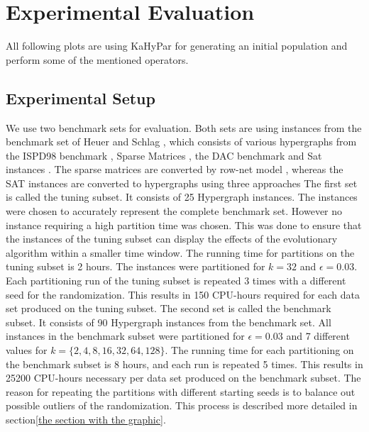 \documentclass[a4paper,12pt,titlepage, BCOR7mm,headsepline]{scrbook}
\numberwithin{equation}{section}
\begin{document}
\chapter{Experimental Evaluation}

All following plots are using KaHyPar for generating an initial population and perform some of the mentioned operators.




\section{Experimental Setup}
We use two benchmark sets for evaluation. Both sets are using instances from the benchmark set of Heuer and Schlag \cite{heuer2017improving}, which consists of various hypergraphs from the ISPD98 benchmark \cite{ISPD98}, Sparse Matrices \cite{SPM colection}, the DAC benchmark \cite{DAC} and Sat instances \cite{SAT}. The sparse matrices are converted by row-net model \cite{row net model}, whereas the SAT instances are converted to hypergraphs using three approaches \cite{}
The first set is called the tuning subset. It consists of 25 Hypergraph instances. The instances were chosen to accurately represent the complete benchmark set. However no instance requiring a high partition time was chosen. This was done to ensure that the instances of the tuning subset can display the effects of the evolutionary algorithm within a smaller time window. The running time for partitions on the tuning subset is 2 hours. The instances were partitioned for $k = 32$ and $\epsilon = 0.03$. Each partitioning run of the tuning subset is repeated 3 times with a different seed for the randomization. This results in 150 CPU-hours required for each data set produced on the tuning subset.
The second set is called the benchmark subset. It consists of 90 Hypergraph instances from the benchmark set. All instances in the benchmark subset were partitioned for $\epsilon = 0.03$ and 7 different values for $k = \{2,4,8,16,32,64,128\}$. The running time for each partitioning on the benchmark subset is 8 hours, and each run is repeated 5 times. This results in 25200 CPU-hours necessary per data set produced on the benchmark subset.
The reason for repeating the partitions with different starting seeds is to balance out possible outliers of the randomization. This process is described more detailed in section\ref{the section with the graphic}.
\end{document}
